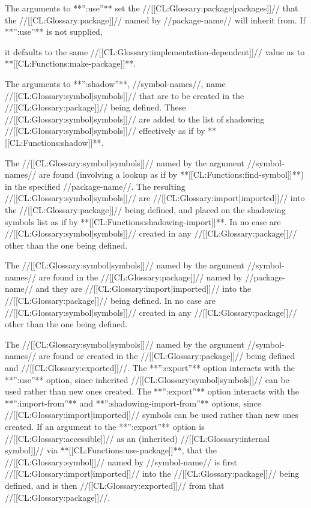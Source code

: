 
The arguments to **'':use''** set the //[[CL:Glossary:package|packages]]// that the //[[CL:Glossary:package]]// named by //package-name// will inherit from. If **'':use''** is not supplied,

it defaults to the same //[[CL:Glossary:implementation-dependent]]// value as  to **[[CL:Functions:make-package]]**.



The arguments to **'':shadow''**, //symbol-names//, name //[[CL:Glossary:symbol|symbols]]// that are to be created in the //[[CL:Glossary:package]]// being defined. These //[[CL:Glossary:symbol|symbols]]// are added to the list of shadowing //[[CL:Glossary:symbol|symbols]]// effectively as if by **[[CL:Functions:shadow]]**.


The //[[CL:Glossary:symbol|symbols]]// named by the argument //symbol-names// are found (involving a lookup as if by **[[CL:Functions:find-symbol]]**) in the specified //package-name//. The resulting //[[CL:Glossary:symbol|symbols]]// are //[[CL:Glossary:import|imported]]// into the //[[CL:Glossary:package]]// being defined, and placed on the shadowing symbols list as if by **[[CL:Functions:shadowing-import]]**. In no case are //[[CL:Glossary:symbol|symbols]]// created in any //[[CL:Glossary:package]]// other than the one being defined.


The //[[CL:Glossary:symbol|symbols]]// named by the argument //symbol-names// are found in the //[[CL:Glossary:package]]// named by //package-name// and they are //[[CL:Glossary:import|imported]]// into the //[[CL:Glossary:package]]// being defined. In no case are //[[CL:Glossary:symbol|symbols]]// created in any //[[CL:Glossary:package]]// other than the one being defined.


The //[[CL:Glossary:symbol|symbols]]// named by the argument //symbol-names// are found or created in the //[[CL:Glossary:package]]// being defined and //[[CL:Glossary:exported]]//. The **'':export''** option interacts with the **'':use''** option, since inherited //[[CL:Glossary:symbol|symbols]]// can be used rather than new ones created. The **'':export''** option interacts with the **'':import-from''** and **'':shadowing-import-from''** options, since //[[CL:Glossary:import|imported]]// symbols can be used rather than new ones created. If an argument to the **'':export''** option is //[[CL:Glossary:accessible]]// as an (inherited) //[[CL:Glossary:internal symbol]]// via **[[CL:Functions:use-package]]**, that the //[[CL:Glossary:symbol]]// named by //symbol-name// is first //[[CL:Glossary:import|imported]]// into the //[[CL:Glossary:package]]// being defined, and is then //[[CL:Glossary:exported]]// from that //[[CL:Glossary:package]]//.

